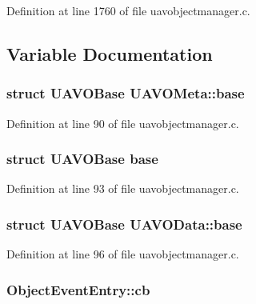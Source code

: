 Definition at line 1760 of file uavobjectmanager.\-c.



\subsection{Variable Documentation}
\hypertarget{group___u_a_v_gadaee40988f6887dd12b46918c829466e}{
\subsubsection[{base}]{\setlength{\rightskip}{0pt plus 5cm}struct {\bf U\-A\-V\-O\-Base} U\-A\-V\-O\-Meta\-::base}}\label{group___u_a_v_gadaee40988f6887dd12b46918c829466e}


Definition at line 90 of file uavobjectmanager.\-c.

\hypertarget{group___u_a_v_gaf41894f299b7a692a649d63f02c30e35}{
\subsubsection[{base}]{\setlength{\rightskip}{0pt plus 5cm}struct {\bf U\-A\-V\-O\-Base} base}}\label{group___u_a_v_gaf41894f299b7a692a649d63f02c30e35}


Definition at line 93 of file uavobjectmanager.\-c.

\hypertarget{group___u_a_v_gacf898b0b5f95119ac33559f504c073cf}{
\subsubsection[{base}]{\setlength{\rightskip}{0pt plus 5cm}struct {\bf U\-A\-V\-O\-Base} U\-A\-V\-O\-Data\-::base}}\label{group___u_a_v_gacf898b0b5f95119ac33559f504c073cf}


Definition at line 96 of file uavobjectmanager.\-c.

\hypertarget{group___u_a_v_ga202f15e5d4be2ca706b2f9ed6fa27d81}{
\subsubsection[{cb}]{ Object\-Event\-Entry\-::cb}}\label{group___u_a_v_ga202f15e5d4be2ca706b2f9ed6fa27d81}


